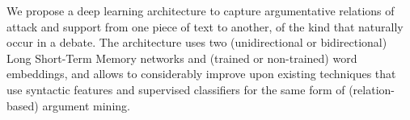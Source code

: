We propose a deep learning architecture to capture argumentative relations of attack and support from one piece of text to another, of the kind that naturally occur in a debate. The architecture uses two (unidirectional or bidirectional) Long Short-Term Memory networks and (trained or non-trained) word embeddings, and allows to considerably improve upon existing techniques that use syntactic features and supervised classifiers for the same form of (relation-based) argument mining.
